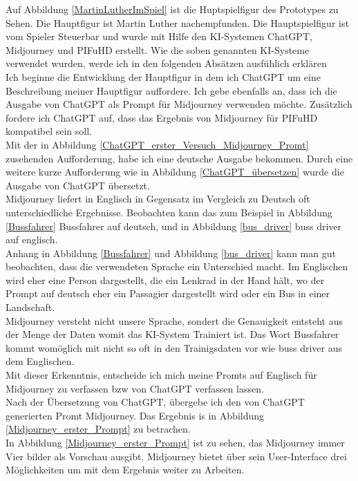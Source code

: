 Auf Abbildung \ref{MartinLutherImSpiel} ist die Huptspielfigur des Prototypes zu Sehen. Die Hauptfigur ist Martin Luther nachempfunden. Die Hauptspielfigur ist vom Spieler Steuerbar und wurde mit Hilfe den KI-Systemen ChatGPT, Midjourney und PIFuHD erstellt. Wie die soben genannten KI-Systeme verwendet wurden, werde ich in den folgenden Absätzen ausfühlich erklären
\\
Ich beginne die Entwicklung der Hauptfigur in dem ich ChatGPT um eine Beschreibung meiner Hauptfigur auffordere. Ich gebe ebenfalls an, dass ich die Ausgabe von ChatGPT als Prompt für Midjourney verwenden möchte. Zusätzlich fordere ich ChatGPT auf, dass das Ergebnis von Midjourney für PIFuHD kompatibel sein soll.
\\
Mit der in Abbildung \ref{ChatGPT_erster_Versuch_Midjourney_Promt} zusehenden Aufforderung, habe ich eine deutsche Ausgabe bekommen. Durch eine weitere kurze Aufforderung wie in Abbildung \ref{ChatGPT_übersetzen} wurde die Ausgabe von ChatGPT übersetzt.
\\
Midjourney liefert in Englisch in Gegensatz im Vergleich zu Deutsch oft unterschiedliche Ergebnisse. Beobachten kann das zum Beispiel in Abbildung \ref{Bussfahrer} Bussfahrer auf deutsch, und in Abbildung \ref{bus_driver} buss driver auf englisch.
\\
Anhang in Abbildung \ref{Bussfahrer} und Abbildung \ref{bus_driver} kann man gut beobachten, dass die verwendeten Sprache ein Unterschied macht. Im Englischen wird eher eine Person dargestellt, die ein Lenkrad in der Hand hält, wo der Prompt auf deutsch eher ein Passagier dargestellt wird oder ein Bus in einer Landschaft.
\\
Midjourney versteht nicht unsere Sprache, sondert die Genauigkeit entsteht aus der Menge der Daten womit das KI-System Trainiert ist. Das Wort Bussfahrer kommt womöglich mit nicht so oft in den Trainigsdaten vor wie buss driver aus dem Englischen.
\\
Mit dieser Erkenntnis, entscheide ich mich meine Promts auf Englisch für Midjourney zu verfassen bzw von ChatGPT verfassen lassen.
\\
Nach der Übersetzung von ChatGPT, übergebe ich den von ChatGPT generierten Promt Midjourney. Das Ergebnis is in Abbildung \ref{Midjourney_erster_Prompt} zu betrachen.
\\
In Abbildung \ref{Midjourney_erster_Prompt} ist zu sehen, das Midjourney immer Vier bilder als Vorschau ausgibt. Midjourney bietet über sein User-Interface drei Möglichkeiten um mit dem Ergebnis weiter zu Arbeiten.
